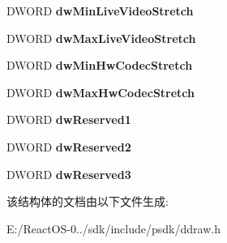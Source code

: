 \begin{DoxyCompactItemize}
\mbox{\label{struct___d_d_c_a_p_s___d_x1_ac5976fa2ef9b89eddffb66e3c535b960}} 
D\+W\+O\+RD {\bfseries dw\+Min\+Live\+Video\+Stretch}
\item 
\mbox{\label{struct___d_d_c_a_p_s___d_x1_a38b5341905cfa494127b2423fbe44144}} 
D\+W\+O\+RD {\bfseries dw\+Max\+Live\+Video\+Stretch}
\item 
\mbox{\label{struct___d_d_c_a_p_s___d_x1_a1e635919c6caf2f15f00dac333e7a191}} 
D\+W\+O\+RD {\bfseries dw\+Min\+Hw\+Codec\+Stretch}
\item 
\mbox{\label{struct___d_d_c_a_p_s___d_x1_a1b7abc69511cdc8c99e196155cbdf99e}} 
D\+W\+O\+RD {\bfseries dw\+Max\+Hw\+Codec\+Stretch}
\item 
\mbox{\label{struct___d_d_c_a_p_s___d_x1_a19c5d2f333226468cd5d582ed6765263}} 
D\+W\+O\+RD {\bfseries dw\+Reserved1}
\item 
\mbox{\label{struct___d_d_c_a_p_s___d_x1_ab22bb7780fb2890194f082580707734c}} 
D\+W\+O\+RD {\bfseries dw\+Reserved2}
\item 
\mbox{\label{struct___d_d_c_a_p_s___d_x1_aebddb586ad2debeb1343631c00b3f544}} 
D\+W\+O\+RD {\bfseries dw\+Reserved3}
\end{DoxyCompactItemize}


该结构体的文档由以下文件生成\+:\begin{DoxyCompactItemize}
\item 
E\+:/\+React\+O\+S-\/0../sdk/include/psdk/ddraw.\+h\end{DoxyCompactItemize}
